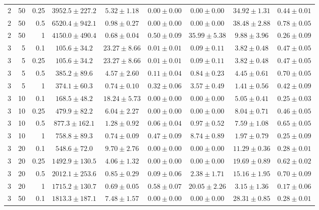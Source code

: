 \begin{table}[htbp]
\begin{tabular}{@{}rrrcccccc@{}}
2 & 50 & 0.25 & $3952.5 \pm 227.2$ & $5.32 \pm 1.18$ & $0.00 \pm 0.00$ & $0.00 \pm 0.00$ & $34.92 \pm 1.31$ & $0.44 \pm 0.01$ \\
2 & 50 & 0.5 & $6520.4 \pm 942.1$ & $0.98 \pm 0.27$ & $0.00 \pm 0.00$ & $0.00 \pm 0.00$ & $38.48 \pm 2.88$ & $0.78 \pm 0.05$ \\
2 & 50 & 1 & $4150.0 \pm 490.4$ & $0.68 \pm 0.04$ & $0.50 \pm 0.09$ & $35.99 \pm 5.38$ & $9.88 \pm 3.96$ & $0.26 \pm 0.09$ \\
\midrule
3 & 5 & 0.1 & $105.6 \pm 34.2$ & $23.27 \pm 8.66$ & $0.01 \pm 0.01$ & $0.09 \pm 0.11$ & $3.82 \pm 0.48$ & $0.47 \pm 0.05$ \\
3 & 5 & 0.25 & $105.6 \pm 34.2$ & $23.27 \pm 8.66$ & $0.01 \pm 0.01$ & $0.09 \pm 0.11$ & $3.82 \pm 0.48$ & $0.47 \pm 0.05$ \\
3 & 5 & 0.5 & $385.2 \pm 89.6$ & $4.57 \pm 2.60$ & $0.11 \pm 0.04$ & $0.84 \pm 0.23$ & $4.45 \pm 0.61$ & $0.70 \pm 0.05$ \\
3 & 5 & 1 & $374.1 \pm 60.3$ & $0.74 \pm 0.10$ & $0.32 \pm 0.06$ & $3.57 \pm 0.49$ & $1.41 \pm 0.56$ & $0.42 \pm 0.09$ \\
3 & 10 & 0.1 & $168.5 \pm 48.2$ & $18.24 \pm 5.73$ & $0.00 \pm 0.00$ & $0.00 \pm 0.00$ & $5.05 \pm 0.41$ & $0.25 \pm 0.03$ \\
3 & 10 & 0.25 & $479.9 \pm 82.2$ & $6.04 \pm 2.27$ & $0.00 \pm 0.00$ & $0.00 \pm 0.00$ & $8.04 \pm 0.71$ & $0.46 \pm 0.05$ \\
3 & 10 & 0.5 & $877.3 \pm 162.1$ & $1.28 \pm 0.92$ & $0.06 \pm 0.04$ & $0.97 \pm 0.52$ & $7.59 \pm 1.08$ & $0.65 \pm 0.05$ \\
3 & 10 & 1 & $758.8 \pm 89.3$ & $0.74 \pm 0.09$ & $0.47 \pm 0.09$ & $8.74 \pm 0.89$ & $1.97 \pm 0.79$ & $0.25 \pm 0.09$ \\
3 & 20 & 0.1 & $548.6 \pm 72.0$ & $9.70 \pm 2.76$ & $0.00 \pm 0.00$ & $0.00 \pm 0.00$ & $11.29 \pm 0.36$ & $0.28 \pm 0.01$ \\
3 & 20 & 0.25 & $1492.9 \pm 130.5$ & $4.06 \pm 1.32$ & $0.00 \pm 0.00$ & $0.00 \pm 0.00$ & $19.69 \pm 0.89$ & $0.62 \pm 0.02$ \\
3 & 20 & 0.5 & $2012.1 \pm 253.6$ & $0.85 \pm 0.29$ & $0.09 \pm 0.06$ & $2.38 \pm 1.71$ & $15.16 \pm 1.95$ & $0.70 \pm 0.09$ \\
3 & 20 & 1 & $1715.2 \pm 130.7$ & $0.69 \pm 0.05$ & $0.58 \pm 0.07$ & $20.05 \pm 2.26$ & $3.15 \pm 1.36$ & $0.17 \pm 0.06$ \\
3 & 50 & 0.1 & $1813.3 \pm 187.1$ & $7.48 \pm 1.57$ & $0.00 \pm 0.00$ & $0.00 \pm 0.00$ & $28.31 \pm 0.85$ & $0.28 \pm 0.01$ \\

\end{tabular}
\end{table}

